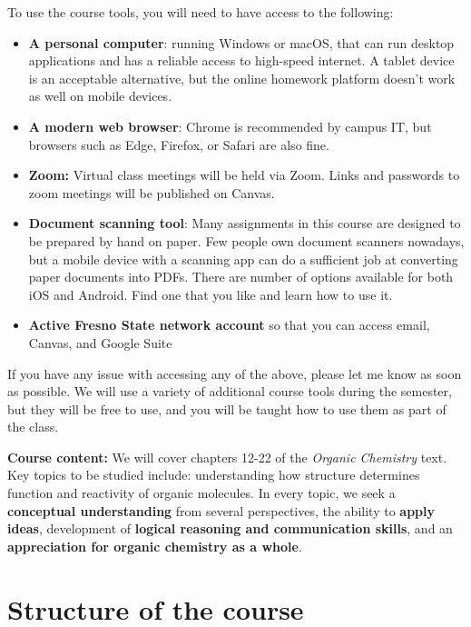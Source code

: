 To use the course tools, you will need to have access to the following:

\begin{itemize}
\tightlist
\item
  \textbf{A personal computer}: running Windows or macOS, that can run
  desktop applications and has a reliable access to high-speed internet.
  A tablet device is an acceptable alternative, but the online homework
  platform doesn't work as well on mobile devices.
\item
  \textbf{A modern web browser}: Chrome is recommended by campus IT, but
  browsers such as Edge, Firefox, or Safari are also fine.
\item
  \textbf{Zoom:} Virtual class meetings will be held via Zoom. Links and
  passwords to zoom meetings will be published on Canvas.
\item
  \textbf{Document scanning tool}: Many assignments in this course are
  designed to be prepared by hand on paper. Few people own document
  scanners nowadays, but a mobile device with a scanning app can do a
  sufficient job at converting paper documents into PDFs. There are
  number of options available for both iOS and Android. Find one that
  you like and learn how to use it.
\item
  \textbf{Active Fresno State network account} so that you can access
  email, Canvas, and Google Suite
\end{itemize}

If you have any issue with accessing any of the above, please let me
know as soon as possible. We will use a variety of additional course
tools during the semester, but they will be free to use, and you will be
taught how to use them as part of the class.

\textbf{Course content:} We will cover chapters 12-22 of the
\emph{Organic Chemistry} text. Key topics to be studied include:
understanding how structure determines function and reactivity of
organic molecules. In every topic, we seek a \textbf{conceptual
understanding} from several perspectives, the ability to \textbf{apply
ideas}, development of \textbf{logical reasoning and communication
skills}, and an \textbf{appreciation for organic chemistry as a whole}.

\hypertarget{structure-of-the-course}{%
\section{Structure of the course}\label{structure-of-the-course}}

